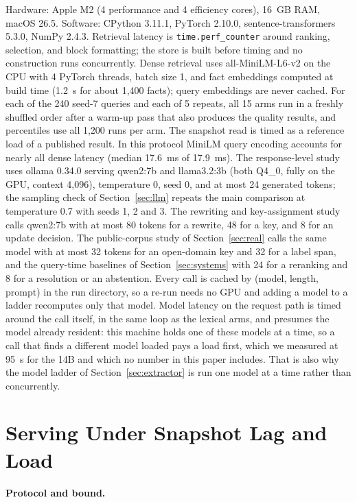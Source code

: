 \documentclass{article} %
\begin{document}
Hardware: Apple M2 (4 performance and 4 efficiency cores), 16~GB RAM, macOS 26.5. Software: CPython 3.11.1, PyTorch 2.10.0, sentence-transformers 5.3.0, NumPy 2.4.3. Retrieval latency is \texttt{time.perf\_counter} around ranking, selection, and block formatting; the store is built before timing and no construction runs concurrently. Dense retrieval uses all-MiniLM-L6-v2 on the CPU with 4 PyTorch threads, batch size 1, and fact embeddings computed at build time (1.2~s for about 1{,}400 facts); query embeddings are never cached. For each of the 240 seed-7 queries and each of 5 repeats, all 15 arms run in a freshly shuffled order after a warm-up pass that also produces the quality results, and percentiles use all 1{,}200 runs per arm. The snapshot read is timed as a reference load of a published result. In this protocol MiniLM query encoding accounts for nearly all dense latency (median 17.6~ms of 17.9~ms). The response-level study uses ollama 0.34.0 serving qwen2:7b and llama3.2:3b (both Q4\_0, fully on the GPU, context 4{,}096), temperature 0, seed 0, and at most 24 generated tokens; the sampling check of Section~\ref{sec:llm} repeats the main comparison at temperature 0.7 with seeds 1, 2 and 3. The rewriting and key-assignment study calls qwen2:7b with at most 80 tokens for a rewrite, 48 for a key, and 8 for an update decision. The public-corpus study of Section~\ref{sec:real} calls the same model with at most 32 tokens for an open-domain key and 32 for a label span, and the query-time baselines of Section~\ref{sec:systems} with 24 for a reranking and 8 for a resolution or an abstention. Every call is cached by (model, length, prompt) in the run directory, so a re-run needs no GPU and adding a model to a ladder recomputes only that model. Model latency on the request path is timed around the call itself, in the same loop as the lexical arms, and presumes the model already resident: this machine holds one of these models at a time, so a call that finds a different model loaded pays a load first, which we measured at 95~s for the 14B and which no number in this paper includes. That is also why the model ladder of Section~\ref{sec:extractor} is run one model at a time rather than concurrently.
\section{Serving Under Snapshot Lag and Load}
\label{app:serving}

\paragraph{Protocol and bound.}
\end{document}
